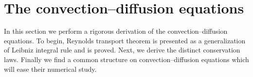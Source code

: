 
\section{The convection--diffusion equations} \label{sec:the_convection_diffusion_equations}

In this section we perform a rigorous derivation of the convection--diffusion equations. To begin, Reynolds transport theorem is presented as a generalization of Leibniz integral rule and is proved. Next, we derive the distinct conservation laws. Finally we find a common structure on convection--diffusion equations which will ease their numerical study.








